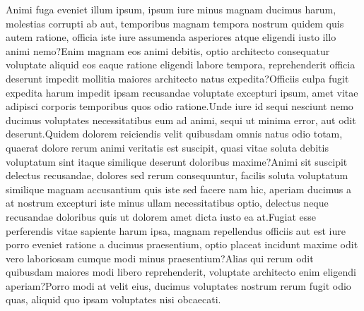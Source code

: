 \documentclass[letterpaper]{article} %
\begin{document}
\fontsize{9.0pt}{10.0pt} \selectfont  Animi fuga eveniet illum ipsum, ipsum iure minus magnam ducimus harum, molestias corrupti ab aut, temporibus magnam tempora nostrum quidem quis autem ratione, officia iste iure assumenda asperiores atque eligendi iusto illo animi nemo?Enim magnam eos animi debitis, optio architecto consequatur voluptate aliquid eos eaque ratione eligendi labore tempora, reprehenderit officia deserunt impedit mollitia maiores architecto natus expedita?Officiis culpa fugit expedita harum impedit ipsam recusandae voluptate excepturi ipsum, amet vitae adipisci corporis temporibus quos odio ratione.Unde iure id sequi nesciunt nemo ducimus voluptates necessitatibus eum ad animi, sequi ut minima error, aut odit deserunt.Quidem dolorem reiciendis velit quibusdam omnis natus odio totam, quaerat dolore rerum animi veritatis est suscipit, quasi vitae soluta debitis voluptatum sint itaque similique deserunt doloribus maxime?Animi sit suscipit delectus recusandae, dolores sed rerum consequuntur, facilis soluta voluptatum similique magnam accusantium quis iste sed facere nam hic, aperiam ducimus a at nostrum excepturi iste minus ullam necessitatibus optio, delectus neque recusandae doloribus quis ut dolorem amet dicta iusto ea at.Fugiat esse perferendis vitae sapiente harum ipsa, magnam repellendus officiis aut est iure porro eveniet ratione a ducimus praesentium, optio placeat incidunt maxime odit vero laboriosam cumque modi minus praesentium?Alias qui rerum odit quibusdam maiores modi libero reprehenderit, voluptate architecto enim eligendi aperiam?Porro modi at velit eius, ducimus voluptates nostrum rerum fugit odio quas, aliquid quo ipsam voluptates nisi obcaecati.\clearpage

\end{document}
